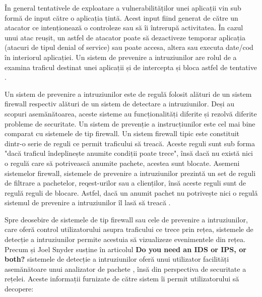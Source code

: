În general tentativele de exploatare a vulnerabilităților unei aplicații vin sub formă de input către o aplicația țintă. Acest input fiind generat de către un atacator ce intenționează o controleze sau să îi întrerupă activitatea. În cazul unui atac reușit, un astfel de atacator poate să dezactiveze temporar aplicația (atacuri de tipul denial of service) sau poate accesa, altera sau executa date/cod în interiorul aplicației. Un sistem de prevenire a intruziunilor are rolul de a examina traficul destinat unei aplicații și de intercepta și bloca astfel de tentative  \cite{what_is_ips}.

Un sistem de prevenire a intruziunilor este de regulă folosit alături de un sistem firewall respectiv alături de un sistem de detectare a intruziunilor. Deși au scopuri asemănătoarea, aceste sisteme au funcționalități diferite și rezolvă diferite probleme de securitate. Un sistem de prevenție a instrucțiunilor este cel mai bine comparat cu sistemele de tip firewall. Un sistem firewall tipic este constituit dintr-o serie de reguli ce permit traficului să treacă. Aceste reguli sunt sub forma "dacă traficul îndeplinește anumite condiții poate trece", însă dacă nu există nici o regulă care să potrivească anumite pachete, acestea sunt blocate. Asemeni sistemelor firewall, sistemele de prevenire a intruziunilor prezintă un set de reguli de filtrare a pachetelor, reqest-urilor  sau a clienților, însă aceste reguli sunt de regulă reguli de blocare. Astfel, dacă un anumit pachet nu potrivește nici o regulă sistemul de prevenire a intruziunilor îl lasă să treacă  \cite{ips_ids}.

Spre deosebire de sistemele de tip firewall sau cele de prevenire a intruziunilor, care oferă control utilizatorului asupra traficului ce trece prin rețea, sistemele de detecție a intruziunilor permite acestuia să vizualizeze evenimentele din rețea. Precum și Joel Snyder susține în articolul  \textbf{Do you need an IDS or IPS, or both?} \cite{ips_ids}  sistemele  de detecție a intruziunilor oferă unui utilizator facilități asemănătoare unui analizator de pachete  \cite{net_an},  însă din perspectiva de securitate a rețelei. Aceste informații furnizate de către sistem îi permit utilizatorului să decopere:  
 

